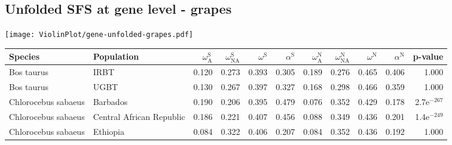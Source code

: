 \subsection{Unfolded SFS at gene level - grapes} 
\begin{center}
\texttt{[image: ViolinPlot/gene-unfolded-grapes.pdf]} 
\begin{adjustbox}{width = 1\textwidth}
\begin{tabular}{llrrrrrrrrr}
\toprule
             Species &                Population & $\omega_{\textrm{A}}^{\textrm{S}}$ & $\omega_{\textrm{NA}}^{\textrm{S}}$ & $\omega^{\textrm{S}}$ & $\alpha^{\textrm{S}}$ & $\omega_{\textrm{A}}^{\textrm{N}}$ & $\omega_{\textrm{NA}}^{\textrm{N}}$ & $\omega^{\textrm{N}}$ & $\alpha^{\textrm{N}}$ &       p-value \\
\midrule
          Bos taurus &                      IRBT &                              0.120 &                               0.273 &                 0.393 &                 0.305 &                              0.189 &                               0.276 &                 0.465 &                 0.406 &         1.000 \\
          Bos taurus &                      UGBT &                              0.130 &                               0.267 &                 0.397 &                 0.327 &                              0.168 &                               0.298 &                 0.466 &                 0.359 &         1.000 \\
 Chlorocebus sabaeus &                  Barbados &                              0.190 &                               0.206 &                 0.395 &                 0.479 &                              0.076 &                               0.352 &                 0.429 &                 0.178 & 2.7e$^{-267}$ \\
 Chlorocebus sabaeus &  Central African Republic &                              0.186 &                               0.221 &                 0.407 &                 0.456 &                              0.088 &                               0.349 &                 0.436 &                 0.201 & 1.4e$^{-249}$ \\
 Chlorocebus sabaeus &                  Ethiopia &                              0.084 &                               0.322 &                 0.406 &                 0.207 &                              0.084 &                               0.352 &                 0.436 &                 0.192 &         1.000 \\

\end{tabular}
\end{adjustbox}
\end{center}
